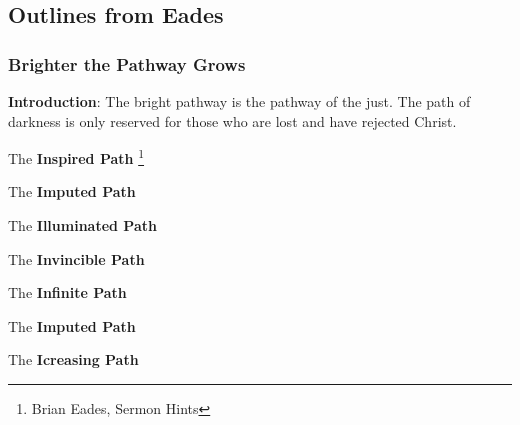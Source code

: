 \subsection{Outlines from Eades}


\subsubsection{Brighter the Pathway Grows}
\textbf{Introduction}: The bright pathway is the pathway of the just. The path of darkness is only reserved for those who are lost and have rejected Christ.
\begin{compactenum}[I.][4]
	\item The \textbf{Inspired Path} \footnote{Brian Eades, Sermon Hints}
	\item The \textbf{Imputed Path}
	\item The \textbf{Illuminated Path}
	\item The \textbf{Invincible Path}
	\item The \textbf{Infinite Path}
	\item The \textbf{Imputed Path}
	\item The \textbf{Icreasing Path}
\end{compactenum}



